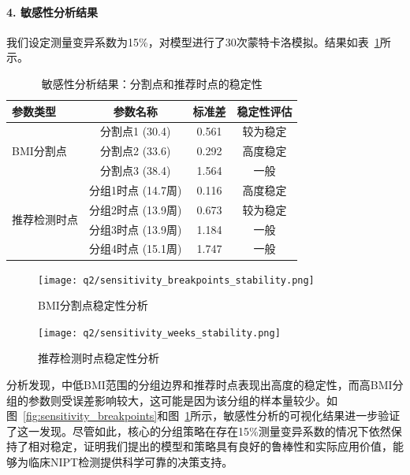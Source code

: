 \paragraph{4. 敏感性分析结果}
我们设定测量变异系数为15\%，对模型进行了30次蒙特卡洛模拟。结果如表~\ref{tab:sensitivity_analysis}所示。

\begin{table}[htbp]
\centering
\caption{敏感性分析结果：分割点和推荐时点的稳定性}
\label{tab:sensitivity_analysis}
\begin{tabular}{lccc}
\toprule
参数类型 & 参数名称 & 标准差 & 稳定性评估 \\
\midrule
\multirow{3}{*}{BMI分割点} & 分割点1 (30.4) & 0.561 & 较为稳定 \\
                         & 分割点2 (33.6) & 0.292 & 高度稳定 \\
                         & 分割点3 (38.4) & 1.564 & 一般 \\
\midrule
\multirow{4}{*}{推荐检测时点} & 分组1时点 (14.7周) & 0.116 & 高度稳定 \\
                            & 分组2时点 (13.9周) & 0.673 & 较为稳定 \\
                            & 分组3时点 (13.9周) & 1.184 & 一般 \\
                            & 分组4时点 (15.1周) & 1.747 & 一般 \\
\bottomrule
\end{tabular}
\end{table}

\begin{figure}[htbp]
    \centering
    \begin{minipage}{0.48\textwidth}
        \centering
        \texttt{[image: q2/sensitivity\_breakpoints\_stability.png]}
        \caption{BMI分割点稳定性分析}
        \label{fig:sensitivity_breakpoints}
    \end{minipage}
    \hfill
    \begin{minipage}{0.48\textwidth}
        \centering
        \texttt{[image: q2/sensitivity\_weeks\_stability.png]}
        \caption{推荐检测时点稳定性分析}
        \label{fig:sensitivity_weeks}
    \end{minipage}
\end{figure}

分析发现，中低BMI范围的分组边界和推荐时点表现出高度的稳定性，而高BMI分组的参数则受误差影响较大，这可能是因为该分组的样本量较少。如图~\ref{fig:sensitivity_breakpoints}和图~\ref{fig:sensitivity_weeks}所示，敏感性分析的可视化结果进一步验证了这一发现。尽管如此，核心的分组策略在存在15\%测量变异系数的情况下依然保持了相对稳定，证明我们提出的模型和策略具有良好的鲁棒性和实际应用价值，能够为临床NIPT检测提供科学可靠的决策支持。